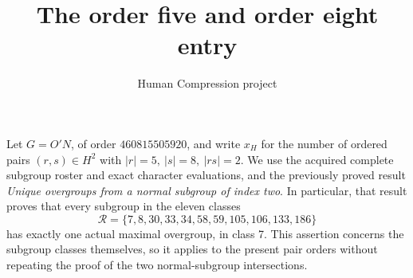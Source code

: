 \documentclass[11pt,a4paper]{article}
\title{The order five and order eight entry}
\author{Human Compression project}\date{}
\begin{document}
\maketitle
Let \(G=O'N\), of order \(460815505920\), and write \(x_H\) for the
number of ordered pairs \((r,s)\in H^2\) with
\(|r|=5,\ |s|=8,\ |rs|=2\). We use the acquired complete subgroup
roster and exact character evaluations, and the previously proved
result \emph{Unique overgroups from a normal subgroup of index two}.
In particular, that result proves that every subgroup in the eleven
classes
\[
 \mathcal R=\{7,8,30,33,34,58,59,105,106,133,186\}
\]
has exactly one actual maximal overgroup, in class 7. This assertion
concerns the subgroup classes themselves, so it applies to the present
pair orders without repeating the proof of the two normal-subgroup
intersections.
\end{document}
